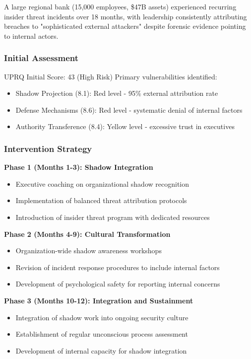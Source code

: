 \documentclass[11pt,a4paper]{article}
\begin{document}
A large regional bank (15,000 employees, \$47B assets) experienced recurring insider threat incidents over 18 months, with leadership consistently attributing breaches to "sophisticated external attackers" despite forensic evidence pointing to internal actors.

\subsubsection{Initial Assessment}

UPRQ Initial Score: 43 (High Risk)
Primary vulnerabilities identified:
\begin{itemize}
\item Shadow Projection (8.1): Red level - 95\% external attribution rate
\item Defense Mechanisms (8.6): Red level - systematic denial of internal factors
\item Authority Transference (8.4): Yellow level - excessive trust in executives
\end{itemize}

\subsubsection{Intervention Strategy}

\textbf{Phase 1 (Months 1-3): Shadow Integration}
\begin{itemize}
\item Executive coaching on organizational shadow recognition
\item Implementation of balanced threat attribution protocols
\item Introduction of insider threat program with dedicated resources
\end{itemize}

\textbf{Phase 2 (Months 4-9): Cultural Transformation}
\begin{itemize}
\item Organization-wide shadow awareness workshops
\item Revision of incident response procedures to include internal factors
\item Development of psychological safety for reporting internal concerns
\end{itemize}

\textbf{Phase 3 (Months 10-12): Integration and Sustainment}
\begin{itemize}
\item Integration of shadow work into ongoing security culture
\item Establishment of regular unconscious process assessment
\item Development of internal capacity for shadow integration
\end{itemize}
\end{document}
